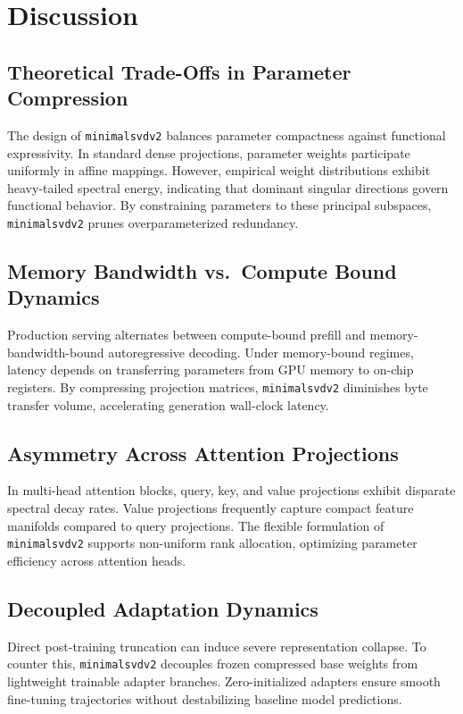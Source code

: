 \section{Discussion}

\subsection{Theoretical Trade-Offs in Parameter Compression}
The design of \texttt{minimalsvdv2} balances parameter compactness against functional expressivity. In standard dense projections, parameter weights participate uniformly in affine mappings. However, empirical weight distributions exhibit heavy-tailed spectral energy, indicating that dominant singular directions govern functional behavior. By constraining parameters to these principal subspaces, \texttt{minimalsvdv2} prunes overparameterized redundancy.

\subsection{Memory Bandwidth vs.\ Compute Bound Dynamics}
Production serving alternates between compute-bound prefill and memory-bandwidth-bound autoregressive decoding. Under memory-bound regimes, latency depends on transferring parameters from GPU memory to on-chip registers. By compressing projection matrices, \texttt{minimalsvdv2} diminishes byte transfer volume, accelerating generation wall-clock latency.

\subsection{Asymmetry Across Attention Projections}
In multi-head attention blocks, query, key, and value projections exhibit disparate spectral decay rates. Value projections frequently capture compact feature manifolds compared to query projections. The flexible formulation of \texttt{minimalsvdv2} supports non-uniform rank allocation, optimizing parameter efficiency across attention heads.

\subsection{Decoupled Adaptation Dynamics}
Direct post-training truncation can induce severe representation collapse. To counter this, \texttt{minimalsvdv2} decouples frozen compressed base weights from lightweight trainable adapter branches. Zero-initialized adapters ensure smooth fine-tuning trajectories without destabilizing baseline model predictions.

